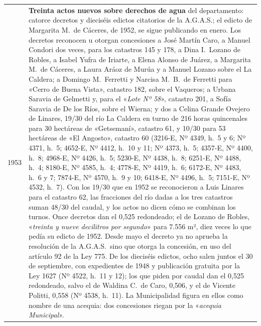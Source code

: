 \begin{longtable}{@{}p{2.7cm}p{10.3cm}@{}}
1953 & \textbf{Treinta actos nuevos sobre derechos de agua} del departamento: catorce decretos y dieciséis edictos citatorios de la A.G.A.S.; el edicto de Margarita M.\ de Cáceres, de 1952, se sigue publicando en enero. Los decretos reconocen u otorgan concesiones a José Martín Caro, a Manuel Condori dos veces, para los catastros 145 y 178, a Dina I.\ Lozano de Robles, a Isabel Yufra de Iriarte, a Elena Alonso de Juárez, a Margarita M.\ de Cáceres, a Laura Aráoz de Murúa y a Manuel Lozano sobre el La Caldera; a Domingo M.\ Ferretti y Narcisa M.\ B.\ de Ferretti para «Cerro de Buena Vista», catastro 182, sobre el Vaqueros; a Urbana Saravia de Gelmetti y, para el «\textit{Lote Nº 58}», catastro 201, a Sofía Saravia de De los Ríos, sobre el Wierna; y dos a Celina Grande Ovejero de Linares, 19/30 del río La Caldera en turno de 216 horas quincenales para 30 hectáreas de «Getsemaní», catastro 61, y 10/30 para 53 hectáreas de «El Angosto», catastro 60 (3216-E, Nº 4349, h.\ 5 y 6; Nº 4371, h.\ 5; 4652-E, Nº 4412, h.\ 10 y 11; Nº 4373, h.\ 5; 4357-E, Nº 4400, h.\ 8; 4968-E, Nº 4426, h.\ 5; 5230-E, Nº 4438, h.\ 8; 6251-E, Nº 4488, h.\ 4; 8180-E, Nº 4585, h.\ 4; 4778-E, Nº 4419, h.\ 6; 6172-E, Nº 4483, h.\ 6 y 7; 7874-E, Nº 4570, h.\ 9 y 10; 6418-E, Nº 4496, h.\ 5; 7151-E, Nº 4532, h.\ 7). Con los 19/30 que en 1952 se reconocieron a Luis Linares para el catastro 62, las fracciones del río dadas a los tres catastros suman 48/30 del caudal, y los actos no dicen cómo se combinan los turnos. Once decretos dan el 0,525 redondeado; el de Lozano de Robles, «\textit{treinta y nueve decilitros por segundo}» para 7.556 m², diez veces lo que pedía su edicto de 1952. Desde mayo el decreto ya no aprueba la resolución de la A.G.A.S.\ sino que otorga la concesión, en uso del artículo 92 de la Ley 775. De los dieciséis edictos, ocho salen juntos el 30 de septiembre, con expedientes de 1948 y publicación gratuita por la Ley 1627 (Nº 4522, h.\ 11 y 12); los que piden por caudal dan el 0,525 redondeado, salvo el de Waldina C.\ de Caro, 0,506, y el de Vicente Politti, 0,558 (Nº 4538, h.\ 11). La Municipalidad figura en ellos como nombre de una acequia: dos concesiones riegan por la «\textit{acequia Municipal}». \\

\end{longtable}

